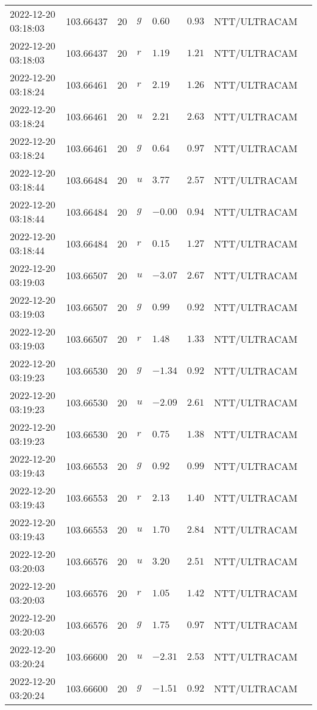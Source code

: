 \documentclass{nature_plusfigure}
\begin{document}
\begin{supplement}
\begin{center}
\begin{longtable}{llllllll}
2022-12-20 03:18:03 & 103.66437 & 20 & $g$ & $0.60$ & $0.93$ & NTT/ULTRACAM &  \\ 
2022-12-20 03:18:03 & 103.66437 & 20 & $r$ & $1.19$ & $1.21$ & NTT/ULTRACAM &  \\ 
2022-12-20 03:18:24 & 103.66461 & 20 & $r$ & $2.19$ & $1.26$ & NTT/ULTRACAM &  \\ 
2022-12-20 03:18:24 & 103.66461 & 20 & $u$ & $2.21$ & $2.63$ & NTT/ULTRACAM &  \\ 
2022-12-20 03:18:24 & 103.66461 & 20 & $g$ & $0.64$ & $0.97$ & NTT/ULTRACAM &  \\ 
2022-12-20 03:18:44 & 103.66484 & 20 & $u$ & $3.77$ & $2.57$ & NTT/ULTRACAM &  \\ 
2022-12-20 03:18:44 & 103.66484 & 20 & $g$ & $-0.00$ & $0.94$ & NTT/ULTRACAM &  \\ 
2022-12-20 03:18:44 & 103.66484 & 20 & $r$ & $0.15$ & $1.27$ & NTT/ULTRACAM &  \\ 
2022-12-20 03:19:03 & 103.66507 & 20 & $u$ & $-3.07$ & $2.67$ & NTT/ULTRACAM &  \\ 
2022-12-20 03:19:03 & 103.66507 & 20 & $g$ & $0.99$ & $0.92$ & NTT/ULTRACAM &  \\ 
2022-12-20 03:19:03 & 103.66507 & 20 & $r$ & $1.48$ & $1.33$ & NTT/ULTRACAM &  \\ 
2022-12-20 03:19:23 & 103.66530 & 20 & $g$ & $-1.34$ & $0.92$ & NTT/ULTRACAM &  \\ 
2022-12-20 03:19:23 & 103.66530 & 20 & $u$ & $-2.09$ & $2.61$ & NTT/ULTRACAM &  \\ 
2022-12-20 03:19:23 & 103.66530 & 20 & $r$ & $0.75$ & $1.38$ & NTT/ULTRACAM &  \\ 
2022-12-20 03:19:43 & 103.66553 & 20 & $g$ & $0.92$ & $0.99$ & NTT/ULTRACAM &  \\ 
2022-12-20 03:19:43 & 103.66553 & 20 & $r$ & $2.13$ & $1.40$ & NTT/ULTRACAM &  \\ 
2022-12-20 03:19:43 & 103.66553 & 20 & $u$ & $1.70$ & $2.84$ & NTT/ULTRACAM &  \\ 
2022-12-20 03:20:03 & 103.66576 & 20 & $u$ & $3.20$ & $2.51$ & NTT/ULTRACAM &  \\ 
2022-12-20 03:20:03 & 103.66576 & 20 & $r$ & $1.05$ & $1.42$ & NTT/ULTRACAM &  \\ 
2022-12-20 03:20:03 & 103.66576 & 20 & $g$ & $1.75$ & $0.97$ & NTT/ULTRACAM &  \\ 
2022-12-20 03:20:24 & 103.66600 & 20 & $u$ & $-2.31$ & $2.53$ & NTT/ULTRACAM &  \\ 
2022-12-20 03:20:24 & 103.66600 & 20 & $g$ & $-1.51$ & $0.92$ & NTT/ULTRACAM &  \\ 

\end{longtable}
\end{center}
\end{supplement}
\end{document}
